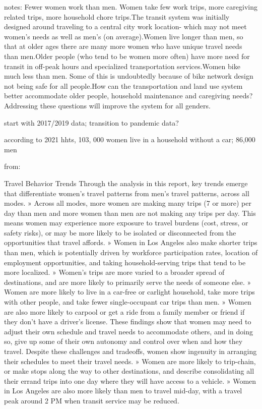 \documentclass[
  12pt,
]{article}
\begin{document}
notes: Fewer women work than men. Women take few work trips, more
caregiving related trips, more household chore trips.The transit system
was initially designed around traveling to a central city work location-
which may not meet women's needs as well as men's (on average).Women
live longer than men, so that at older ages there are many more women
who have unique travel needs than men.Older people (who tend to be women
more often) have more need for transit in off-peak hours and specialized
transportation services.Women bike much less than men. Some of this is
undoubtedly because of bike network design not being safe for all
people.How can the transportation and land use system better accommodate
older people, household maintenance and caregiving needs? Addressing
these questions will improve the system for all genders.

start with 2017/2019 data; transition to pandemic data?

according to 2021 hhts, 103, 000 women live in a household without a
car; 86,000 men

from:

Travel Behavior Trends Through the analysis in this report, key trends
emerge that differentiate women's travel patterns from men's travel
patterns, across all modes. » Across all modes, more women are making
many trips (7 or more) per day than men and more women than men are not
making any trips per day. This means women may experience more exposure
to travel burdens (cost, stress, or safety risks), or may be more likely
to be isolated or disconnected from the opportunities that travel
affords. » Women in Los Angeles also make shorter trips than men, which
is potentially driven by workforce participation rates, location of
employment opportunities, and taking household-serving trips that tend
to be more localized. » Women's trips are more varied to a broader
spread of destinations, and are more likely to primarily serve the needs
of someone else. » Women are more likely to live in a car-free or
carlight household, take more trips with other people, and take fewer
single-occupant car trips than men. » Women are also more likely to
carpool or get a ride from a family member or friend if they don't have
a driver's license. These findings show that women may need to adjust
their own schedule and travel needs to accommodate others, and in doing
so, give up some of their own autonomy and control over when and how
they travel. Despite these challenges and tradeoffs, women show
ingenuity in arranging their schedules to meet their travel needs. »
Women are more likely to trip-chain, or make stops along the way to
other destinations, and describe consolidating all their errand trips
into one day where they will have access to a vehicle. » Women in Los
Angeles are also more likely than men to travel mid-day, with a travel
peak around 2 PM when transit service may be reduced.
\end{document}
